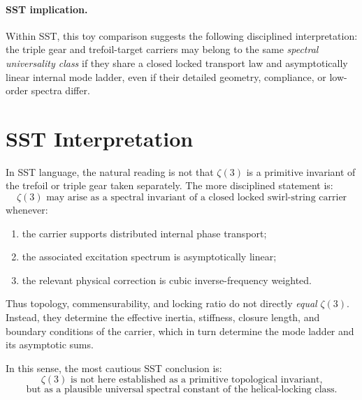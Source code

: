 \documentclass[11pt]{article}
\begin{document}
    \paragraph{SST implication.}
        Within SST, this toy comparison suggests the following disciplined interpretation:
        the triple gear and trefoil-target carriers may belong to the same \emph{spectral universality class}
        if they share a closed locked transport law and asymptotically linear internal mode ladder,
        even if their detailed geometry, compliance, or low-order spectra differ.
        
        
    \section{SST Interpretation}
    
    In SST language, the natural reading is not that \(\zeta(3)\) is a primitive invariant of the trefoil or triple gear taken separately. The more disciplined statement is:
    \begin{equation}
        \zeta(3)
        \text{ may arise as a spectral invariant of a closed locked swirl-string carrier}
    \end{equation}
    whenever:
    \begin{enumerate}
        \item the carrier supports distributed internal phase transport;
        \item the associated excitation spectrum is asymptotically linear;
        \item the relevant physical correction is cubic inverse-frequency weighted.
    \end{enumerate}
    
    Thus topology, commensurability, and locking ratio do not directly \emph{equal} \(\zeta(3)\). Instead, they determine the effective inertia, stiffness, closure length, and boundary conditions of the carrier, which in turn determine the mode ladder and its asymptotic sums.
    
    In this sense, the most cautious SST conclusion is:
    \begin{equation}
        \boxed{
            \zeta(3)\text{ is not here established as a primitive topological invariant,}
        }
    \end{equation}
    \begin{equation}
        \boxed{
            \text{but as a plausible universal spectral constant of the helical-locking class.}
        }
    \end{equation}
    
\end{document}
